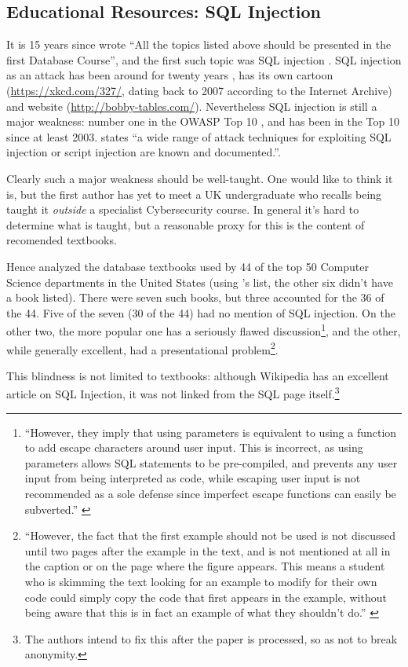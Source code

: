\documentclass[sigconf,anonymous]{acmart}
\begin{document}


\subsection{Educational Resources: SQL Injection}\label{sec:SQL}
It is 15 years since \cite{Guimaraesetal2004} 
wrote ``All the topics listed above should be presented in the first
Database Course'', and the first such topic was SQL injection \cite{SPIDynamics2002,Anonymous2018b}. SQL injection as an attack has been around for twenty years \cite{HornerHyslip2017a}, has its own cartoon (\url{https://xkcd.com/327/}, dating back to 2007 according to the Internet Archive) and website (\url{http://bobby-tables.com/}). Nevertheless SQL injection is still a major weakness: number one in the OWASP Top 10 \cite{OWASP2017a}, and has been in the Top 10 since at least 2003.  \cite[the UK's definitive reference]{Bristol2018a} states ``a wide range of attack techniques for exploiting SQL
injection or script injection are known and documented.''.

Clearly such a major weakness should be well-taught. One would like to think it is, but the first author has yet to meet a UK undergraduate who recalls being taught it \emph{outside} a specialist Cybersecurity course.  In general it's hard to determine what is taught, but a reasonable proxy for this is the content of recomended textbooks. 

Hence \cite{Drop2019} analyzed the database textbooks used by  44 of the top 50 Computer Science
departments in the United States (using \cite{StangerMartin2015a}'s list, the other six didn't have a book listed). There were seven such books, but three accounted for the 36 of the 44. Five of the seven (30 of the 44) had no mention of SQL injection. On the other two, the more popular one has a seriously flawed discussion\footnote{``However, they imply that using parameters is equivalent to using a function to add escape characters
around user input. This is incorrect, as using parameters allows
SQL statements to be pre-compiled, and prevents any user input
from being interpreted as code, while escaping user input is not
recommended as a sole defense since imperfect escape functions
can easily be subverted.'' \cite{Drop2019}}, and the other, while generally excellent, had a presentational problem\footnote{``However, the fact that the first
example should not be used is not discussed until two pages after
the example in the text, and is not mentioned at all in the caption or
on the page where the figure appears. This means a student who is
skimming the text looking for an example to modify for their own
code could simply copy the code that first appears in the example,
without being aware that this is in fact an example of what they
shouldn't do.'' \cite{Drop2019}}.
\par
This blindness is not limited to textbooks: although Wikipedia has an excellent article on SQL Injection, it was not linked from the SQL page itself.\footnote{The authors intend to fix this after the paper is processed, so as not to break anonymity.}
\end{document}
